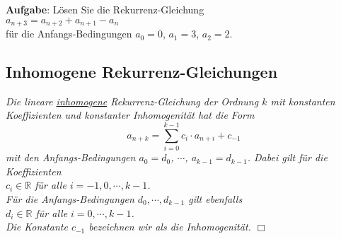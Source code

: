 \noindent
\textbf{Aufgabe}: Lösen Sie die Rekurrenz-Gleichung \\[0.2cm]
\hspace*{1.3cm} $a_{n+3} = a_{n+2} + a_{n+1} - a_n$ \\[0.2cm]
für die Anfangs-Bedingungen $a_0 = 0$, $a_1 = 3$, $a_2 = 2$.

\pagebreak

\subsection{Inhomogene Rekurrenz-Gleichungen}    
\begin{Definition} \lb
{\em Die \emph{lineare \underline{inhomo}g\underline{ene} Rekur\-renz-Gleichung der Ordnung
$k$ mit konstanten Koeffizienten und konstanter Inhomogenität} hat die Form 
\begin{equation}
  \label{eq:lihrg}
     a_{n+k} = \sum\limits_{i=0}^{k-1} c_{i} \cdot a_{n+i} + c_{-1}  
\end{equation}
     mit den Anfangs-Bedingungen $a_0 = d_0$, $\cdots$, $a_{k-1} = d_{k-1}$. 
     Dabei gilt für die Koeffizienten \\[0.2cm]
     \hspace*{1.3cm} $c_i \in \mathbb{R}$ \quad für alle $i = -1, 0,\cdots, k-1$. \\[0.2cm]
     Für die  \emph{Anfangs-Bedingungen} $d_0, \cdots, d_{k-1}$ gilt ebenfalls \\[0.2cm]
     \hspace*{1.3cm} $d_i \in \mathbb{R}$ \quad für alle $i = 0,\cdots, k-1$. \\[0.2cm]
     Die Konstante $c_{-1}$ bezeichnen wir als die \emph{Inhomogenität}. 
     \hspace*{\fill} $\Box$
}
\end{Definition}

